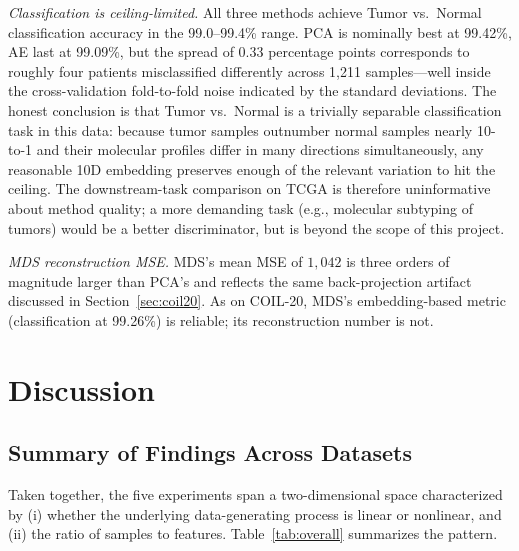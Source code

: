 \documentclass[11pt]{article}
\begin{document}
\emph{Classification is ceiling-limited.} All three methods achieve Tumor vs.\ Normal classification accuracy in the 99.0--99.4\% range. PCA is nominally best at 99.42\%, AE last at 99.09\%, but the spread of 0.33 percentage points corresponds to roughly four patients misclassified differently across 1{,}211 samples---well inside the cross-validation fold-to-fold noise indicated by the standard deviations. The honest conclusion is that Tumor vs.\ Normal is a trivially separable classification task in this data: because tumor samples outnumber normal samples nearly 10-to-1 and their molecular profiles differ in many directions simultaneously, any reasonable 10D embedding preserves enough of the relevant variation to hit the ceiling. The downstream-task comparison on TCGA is therefore uninformative about method quality; a more demanding task (e.g., molecular subtyping of tumors) would be a better discriminator, but is beyond the scope of this project.

\emph{MDS reconstruction MSE.} MDS's mean MSE of $1{,}042$ is three orders of magnitude larger than PCA's and reflects the same back-projection artifact discussed in Section~\ref{sec:coil20}. As on COIL-20, MDS's embedding-based metric (classification at 99.26\%) is reliable; its reconstruction number is not.

\section{Discussion}

\subsection{Summary of Findings Across Datasets}

Taken together, the five experiments span a two-dimensional space characterized by (i) whether the underlying data-generating process is linear or nonlinear, and (ii) the ratio of samples to features. Table~\ref{tab:overall} summarizes the pattern.
\end{document}
